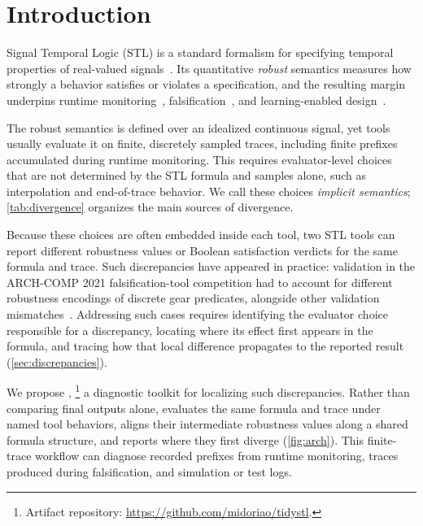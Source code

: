 \section{Introduction}
\label{sec:intro}

Signal Temporal Logic (STL) is a standard formalism for specifying temporal
properties of real-valued signals~\cite{maler2004monitoring,fainekos2009robustness}.
Its quantitative \emph{robust} semantics measures how strongly a behavior
satisfies or violates a specification, and the resulting margin underpins runtime
monitoring~\cite{bartocci2018survey}, falsification~\cite{annpureddy2011staliro},
and learning-enabled design~\cite{raman2014mpc}.

The robust semantics is defined over an idealized continuous signal, yet tools
usually evaluate it on finite, discretely sampled traces, including finite
prefixes accumulated during runtime monitoring.
This requires evaluator-level choices that are not determined by the STL formula and samples alone, such as interpolation and end-of-trace behavior.
We call these choices \emph{implicit semantics}; \cref{tab:divergence} organizes the main sources of divergence.

Because these choices are often embedded inside each tool, two STL tools
can report different robustness values or Boolean satisfaction verdicts for
the same formula and trace.
Such discrepancies have appeared in practice: validation in the ARCH-COMP 2021
falsification-tool competition had to account for different robustness
encodings of discrete gear predicates, alongside other validation
mismatches~\cite{ernst2021archcomp}. Addressing such cases requires identifying
the evaluator choice responsible for a discrepancy, locating where its effect
first appears in the formula, and tracing how that local difference propagates
to the reported result (\cref{sec:discrepancies}).

We propose \tool,%
\footnote{Artifact repository: \url{https://github.com/midoriao/tidystl}.}
a diagnostic toolkit for localizing such discrepancies.
Rather than comparing final outputs alone, \tool evaluates the same formula and
trace under named tool behaviors, aligns their intermediate robustness values
along a shared formula structure, and reports where they first diverge
(\cref{fig:arch}).
This finite-trace workflow can diagnose recorded prefixes from runtime
monitoring, traces produced during falsification, and simulation or test logs.

